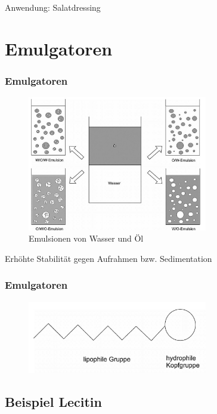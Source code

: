 \documentclass{beamer} %
\begin{document}
\begin{frame}{Anwendung: Salatdressing}

\end{frame}



\section{Emulgatoren}
\begin{frame}
\frametitle{Emulgatoren}
\begin{figure}
\centering
\includegraphics[width = 0.7\textwidth]{Emulsionsarten.JPG}
\caption{Emulsionen von Wasser und Öl}
\end{figure}
\begin{block}{}
Erhöhte Stabilität gegen Aufrahmen bzw. Sedimentation
\end{block}
\end{frame}

\begin{frame}
\frametitle{Emulgatoren}
\begin{figure}
\centering
\includegraphics[width = 0.7\textwidth]{EmulgatorAllgemein.JPG}
\end{figure}
\end{frame}

\subsection{Beispiel Lecitin}
\end{document}
